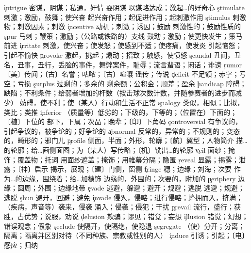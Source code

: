\begin{multicols}{2}
\c{intrigue}  \n 密谋，阴谋；私通，奸情 \vi 耍阴谋 \vt 以谋略达成；激起…的好奇心
\c{stimulate}  \vt 刺激；激励，鼓舞；使兴奋 \vi 起兴奋作用；起促进作用；起刺激作用
\c{stimulus}  \n 刺激物；刺激因素；刺激
\c{incentive}  \n 动机；刺激；诱因；鼓励 \a 刺激性的；鼓励性质的
\c{spur}  \n 马刺；鞭策；激励；（公路或铁路的）支线 \v 鼓动；激励；使更快发生；策马前进
\c{irritate}  \vt 刺激，使兴奋；使发怒；使感到不适；使疼痛，使发炎 \vi 引起恼怒；引起不愉快
\c{provoke}  \vt 激起，挑起；煽动；招致；触怒，使愤怒
\c{scandal}  \n 丑闻，丑名，丑事，丑行，丢脸的事件，舞弊案件，耻辱；流言蜚语；闲话；诽谤
\c{rumor}  \n 〔美〕传闻；〔古〕名誉；咕哝；〔古〕喧嚷 \vt 谣传；传说
\c{deficit}  \n 不足额；赤字；亏空；亏损 
\c{surplus}  \a 过剩的；多余的 \n 剩余额；公积金；顺差；盈余
\c{handicap}  \n 障碍；缺陷；不利条件；给弱者增加的杆数（按击球次数计数，并随参赛者的进步而减少） \vt 妨碍，使不利；使（某人）行动和生活不正常
\c{analogy}  \n 类似，相似；比拟，类比；类推
\c{inferior}  \a （质量等）低劣的；下级的，下等的；（位置在）下面的；〔植〕下位的 \n 部下，下属；次品；晚辈；〔印〕下角码
\c{controversial}  \a 有争议的，引起争议的，被争论的；好争论的
\c{abnormal}  \a 反常的，异常的；不规则的；变态的，畸形的；邪门儿
\c{profile}  \n 侧面，半面；外形，轮廓；〔航〕翼型；人物简介 \vt 描…的轮廓；给…画侧面图；为（某人）写传略；〔机〕铣出…的轮廓 
\c{veil}  \n 面纱；掩饰；覆盖物；托词 \vt 用面纱遮盖；掩饰；用帷幕分隔；隐匿
\c{reveal}  \vt 显露；揭露；泄露；〔神〕启示 \n 揭示，展现；〔建〕门侧，窗侧
\c{fringe}  \n 穗；边缘；刘海；次要 \vt 作为…的边缘，围绕着；给…加穗饰 \a 边缘的，外围的；次要的，附加的 
\c{periphery}  \n 边缘；圆周；外围；边缘地带
\c{evade}  \vt 逃避，躲避；避开；规避；逃脱 \vi 逃避；规避；逃脱
\c{shun}  \vt 避开，回避；避免
\c{invade}  \v 侵入，侵略；进行侵略；蜂拥而入，挤满；（疾病，声音等）袭来，侵袭 \vt 涌入；侵袭；侵犯；干扰
\c{prevail}  \vi 流行，盛行；获胜，占优势；说服，劝说
\c{delusion}  \n 欺骗；谬见；错觉；妄想
\c{illusion}  \n 错觉；幻想；错误观念；假象
\c{seclude}  \vt 使隔开，使隔绝，使隐退
\c{segregate}  \vt （使）分开；分离；隔离；隔离并区别对待（不同种族、宗教或性别的人）
\c{induce}  \vt 引诱；引起；〔电〕感应；归纳

\end{multicols}
